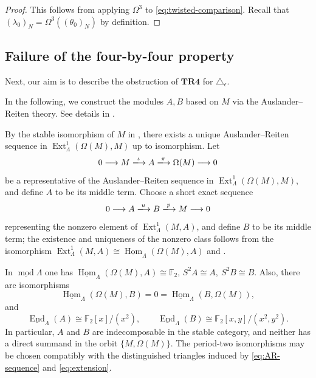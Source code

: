 \documentclass[a4paper,reqno,10pt]{amsart}
\numberwithin{equation}{section}
\DeclareMathOperator{\modu}{mod}
\DeclareMathOperator{\End}{End}
\DeclareMathOperator{\Hom}{Hom}
\newcommand{\kk}{\mathbb F_2}
\newcommand{\Lam}{\Lambda}
\newcommand{\eps}{\epsilon}
\newcommand{\ol}[1]{\underline{#1}}
\begin{document}
\begin{proof}
This follows from applying $\Omega^3$ to \eqref{eq:twisted-comparison}. Recall that $(\lambda_0)_N=\Omega^3((\theta_0)_N)$ by definition. 
\end{proof}

\subsection{Failure of the four-by-four property}
\label{sec:square}
Next, our aim is to describe the obstruction of $\mathbf{TR4}$ for $\triangle_\eps$.  

In the following, we construct the modules $A,B$ based on $M$ via the Auslander-- Reiten theory. See details in \cite{AuslanderReitenSmalo1995}.
\begin{definition}\label{def:modules-AB}
By the stable isomorphism of $M$ in , there exists a unique Auslander--Reiten sequence in $\operatorname{Ext}^1_\Lambda(\Omega(M),M)$ up to isomorphism. 
Let
\begin{equation}\label{eq:AR-sequence}
 0\longrightarrow M\xlongrightarrow{\iota}A
 \xlongrightarrow{\pi}\Omega(M)\longrightarrow0
\end{equation}
be a representative of the Auslander--Reiten sequence in $\operatorname{Ext}^1_\Lambda(\Omega(M),M)$, and define $A$ to be its
middle term. Choose a short exact sequence
\begin{equation}\label{eq:extension}
 0\longrightarrow A\xlongrightarrow{u}B
 \xlongrightarrow{p}M\longrightarrow0
\end{equation}
representing the nonzero element of $\operatorname{Ext}^1_\Lam(M,A)$, and
define $B$ to be its middle term; the existence and uniqueness of the nonzero class follows from the isomorphism $\operatorname{Ext}^1_\Lambda(M,A)\cong \ol{\Hom}_\Lam(\Omega(M),A)$ and .
\end{definition}

\begin{proposition}\label{prop:intrinsic-relations}
In $\ol{\modu}\Lam$ one has $\ol{\Hom}_\Lam(\Omega(M),A)\cong\kk$, 
$
 S^2A\cong A,~S^2B\cong B.
$
Also, there are isomorphisms
\[\ol{\Hom}_\Lam(\Omega(M),B)=0=\ol{\Hom}_\Lam(B,\Omega(M)),
\]
and
\begin{equation}\label{eq:endomorphism-algebras}
 \ol{\End}_\Lam(A)\cong\kk[x]/(x^2),\qquad
 \ol{\End}_\Lam(B)\cong\kk[x,y]/(x^2,y^2).
\end{equation}
In particular, $A$ and $B$ are indecomposable in the stable category, and
neither has a direct summand in the orbit $\{M,\Omega(M)\}$. The period-two
isomorphisms may be chosen compatibly with the distinguished triangles induced by
\eqref{eq:AR-sequence} and \eqref{eq:extension}.
\end{proposition}
\end{document}
